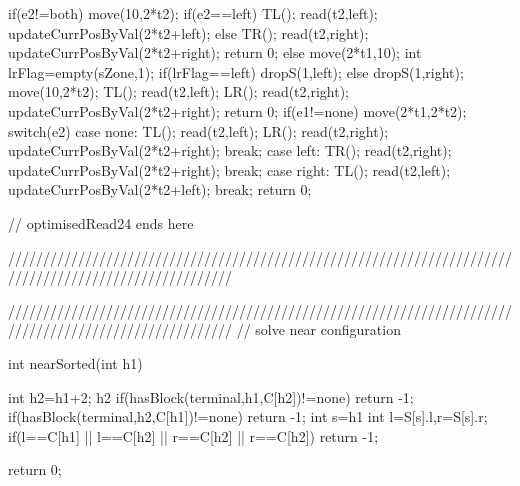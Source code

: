 {{{{{                    if(e2!=both)
                    {
                        move(10,2*t2);
                        if(e2==left)
                        {
                            TL();
                            read(t2,left);
                            updateCurrPosByVal(2*t2+left);
                        }
                        else
                        {
                            TR();
                            read(t2,right);
                            updateCurrPosByVal(2*t2+right);
                        }
                    }
                    return 0;
                }
            }
            else
            {
                move(2*t1,10);
                int lrFlag=empty(sZone,1);
                if(lrFlag==left)
                {
                    dropS(1,left);
                }
                else
                    dropS(1,right);
                move(10,2*t2);
                TL();
                read(t2,left);
                LR();
                read(t2,right);
                updateCurrPosByVal(2*t2+right);
                return 0;
            }
        }
        if(e1!=none)
        {
            move(2*t1,2*t2);
        }
        switch(e2)
        {
            case none:
                TL();
                read(t2,left);
                LR();
                read(t2,right);
                updateCurrPosByVal(2*t2+right);
                break;
            case left:
                TR();
                read(t2,right);
                updateCurrPosByVal(2*t2+right);
                break;
            case right:
                TL();
                read(t2,left);
                updateCurrPosByVal(2*t2+left);
                break;
        }
    }
	return 0;
}

// optimisedRead24 ends here


////////////////////////////////////////////////////////////////////////////////////////////////////////






////////////////////////////////////////////////////////////////////////////////////////////////////////
// solve near configuration

int nearSorted(int h1)
{
    int h2=h1+2;
    h2%
    if(hasBlock(terminal,h1,C[h2])!=none)
        return -1;
    if(hasBlock(terminal,h2,C[h1])!=none)
        return -1;
    int s=h1%
    int l=S[s].l,r=S[s].r;
    if(l==C[h1] || l==C[h2] || r==C[h2] || r==C[h2])
        return -1;

    return 0;
}

